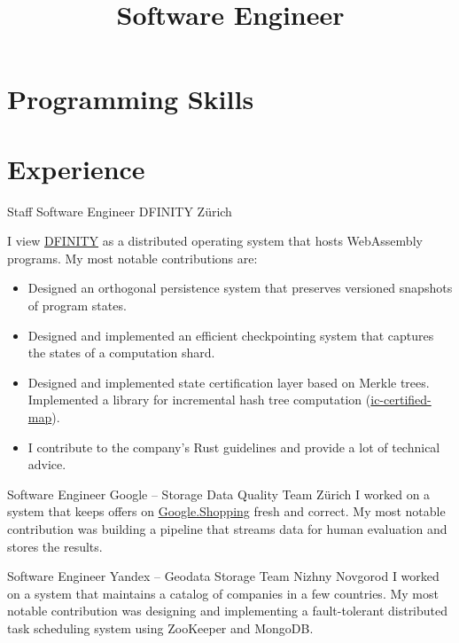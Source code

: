 \documentclass[11pt,a4paper,sans]{moderncv}
\title{Software Engineer}
\newcommand{\Cpp}{C{}\texttt{++}}
\begin{document}
\makecvtitle

\section{Programming Skills}
\cvitem{Proficient}{Rust, \Cpp{}, C}

\section{Experience}

{Staff Software Engineer}
{DFINITY}
{Z\"{u}rich}
{}
{
  I view \href{https://dfinity.org/}{\textsc{DFINITY}} as a distributed operating system that hosts WebAssembly programs.
  My most notable contributions are:
  \begin{itemize}
      \item Designed an orthogonal persistence system that preserves versioned snapshots of program states.
      \item Designed and implemented an efficient checkpointing system that captures the states of a computation shard.
      \item Designed and implemented state certification layer based on Merkle trees.
          Implemented a library for incremental hash tree computation (\href{https://crates.io/crates/ic-certified-map/}{ic-certified-map}).
      \item I contribute to the company's Rust guidelines and provide a lot of technical advice.
  \end{itemize}
}

{Software Engineer}
{Google -- Storage Data Quality Team}
{Z\"{u}rich}
{}
{
    I worked on a system that keeps offers on \href{https://shopping.google.com/}{Google.Shopping} fresh and correct.
  My most notable contribution was building a pipeline that streams data for human evaluation and stores the results.
}

{Software Engineer}
{Yandex -- Geodata Storage Team}
{Nizhny Novgorod}
{}
{
  I worked on a system that maintains a catalog of companies in a few countries.
  My most notable contribution was designing and implementing a fault-tolerant distributed task scheduling system using ZooKeeper and MongoDB.
}
\end{document}
